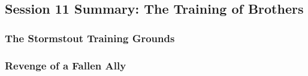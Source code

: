 \subsection{Session 11 Summary: The Training of Brothers}

\subsubsection{The Stormstout Training Grounds}



\subsubsection{Revenge of a Fallen Ally}